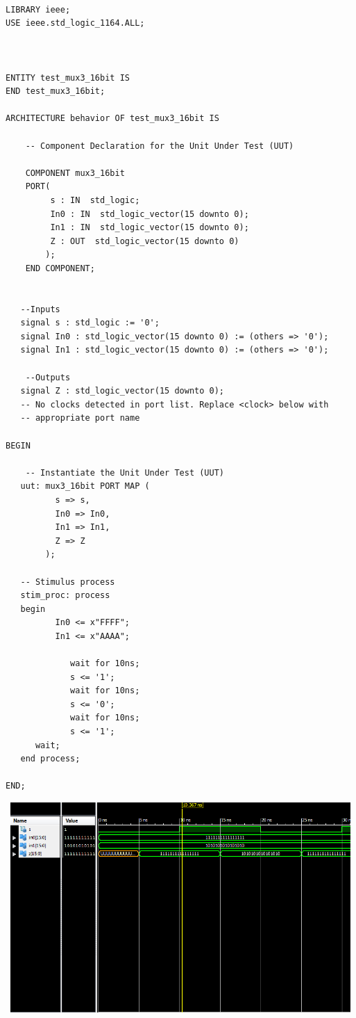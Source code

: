 \documentclass{article}
\begin{document}
\begin{lstlisting}

LIBRARY ieee;
USE ieee.std_logic_1164.ALL;
 

 
ENTITY test_mux3_16bit IS
END test_mux3_16bit;
 
ARCHITECTURE behavior OF test_mux3_16bit IS 
 
    -- Component Declaration for the Unit Under Test (UUT)
 
    COMPONENT mux3_16bit
    PORT(
         s : IN  std_logic;
         In0 : IN  std_logic_vector(15 downto 0);
         In1 : IN  std_logic_vector(15 downto 0);
         Z : OUT  std_logic_vector(15 downto 0)
        );
    END COMPONENT;
    

   --Inputs
   signal s : std_logic := '0';
   signal In0 : std_logic_vector(15 downto 0) := (others => '0');
   signal In1 : std_logic_vector(15 downto 0) := (others => '0');

 	--Outputs
   signal Z : std_logic_vector(15 downto 0);
   -- No clocks detected in port list. Replace <clock> below with 
   -- appropriate port name 
 
BEGIN
 
	-- Instantiate the Unit Under Test (UUT)
   uut: mux3_16bit PORT MAP (
          s => s,
          In0 => In0,
          In1 => In1,
          Z => Z
        );

   -- Stimulus process
   stim_proc: process
   begin		
          In0 <= x"FFFF";
          In1 <= x"AAAA";
			 
			 wait for 10ns;
			 s <= '1';
			 wait for 10ns;
			 s <= '0';
			 wait for 10ns;
			 s <= '1';
      wait;
   end process;

END;
\end{lstlisting}
\includegraphics[width=16cm, height=8cm]{test_mux3.png}
\pagebreak
\end{document}
